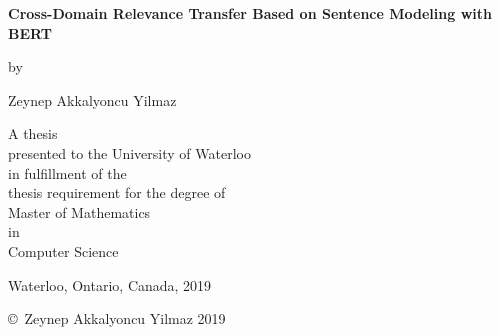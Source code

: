 \pagestyle{empty}

\begin{titlepage}
        \begin{center}
        \vspace*{1.0cm}

        \Huge
        {\bf Cross-Domain Relevance Transfer Based on Sentence Modeling with BERT}

        \vspace*{1.0cm}

        \normalsize
        by \\

        \vspace*{1.0cm}

        \Large
        Zeynep Akkalyoncu Yilmaz \\

        \vspace*{3.0cm}

        \normalsize
        A thesis \\
        presented to the University of Waterloo \\ 
        in fulfillment of the \\
        thesis requirement for the degree of \\
        Master of Mathematics \\
        in \\
        Computer Science \\

        \vspace*{2.0cm}

        Waterloo, Ontario, Canada, 2019 \\

        \vspace*{1.0cm}

        \copyright\ Zeynep Akkalyoncu Yilmaz 2019 \\
        \end{center}
\end{titlepage}

\pagestyle{plain}
\setcounter{page}{2}

